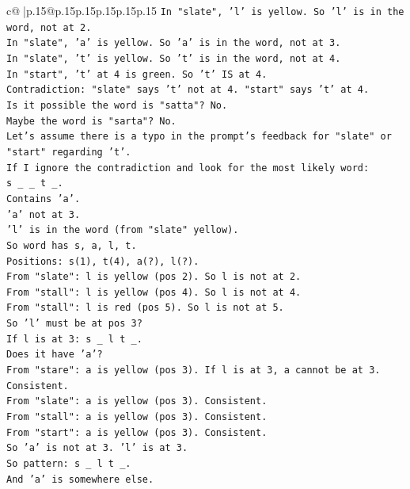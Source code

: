 \documentclass{article}
\begin{document}
{\begin{supertabular}{c@{$\;$}|p{.15\linewidth}@{}p{.15\linewidth}p{.15\linewidth}p{.15\linewidth}p{.15\linewidth}p{.15\linewidth}}
{{{\texttt{In "slate", 'l' is yellow. So 'l' is in the word, not at 2.} \\
\texttt{In "slate", 'a' is yellow. So 'a' is in the word, not at 3.} \\
\texttt{In "slate", 't' is yellow. So 't' is in the word, not at 4.} \\
\texttt{In "start", 't' at 4 is green. So 't' IS at 4.} \\
\texttt{Contradiction: "slate" says 't' not at 4. "start" says 't' at 4.} \\
\texttt{Is it possible the word is "satta"? No.} \\
\texttt{Maybe the word is "sarta"? No.} \\
\texttt{Let's assume there is a typo in the prompt's feedback for "slate" or "start" regarding 't'.} \\
\texttt{If I ignore the contradiction and look for the most likely word:} \\
\texttt{s \_ \_ t \_.} \\
\texttt{Contains 'a'.} \\
\texttt{'a' not at 3.} \\
\texttt{'l' is in the word (from "slate" yellow).} \\
\texttt{So word has s, a, l, t.} \\
\texttt{Positions: s(1), t(4), a(?), l(?).} \\
\texttt{From "slate": l is yellow (pos 2). So l is not at 2.} \\
\texttt{From "stall": l is yellow (pos 4). So l is not at 4.} \\
\texttt{From "stall": l is red (pos 5). So l is not at 5.} \\
\texttt{So 'l' must be at pos 3?} \\
\texttt{If l is at 3: s \_ l t \_.} \\
\texttt{Does it have 'a'?} \\
\texttt{From "stare": a is yellow (pos 3). If l is at 3, a cannot be at 3. Consistent.} \\
\texttt{From "slate": a is yellow (pos 3). Consistent.} \\
\texttt{From "stall": a is yellow (pos 3). Consistent.} \\
\texttt{From "start": a is yellow (pos 3). Consistent.} \\
\texttt{So 'a' is not at 3. 'l' is at 3.} \\
\texttt{So pattern: s \_ l t \_.} \\
\texttt{And 'a' is somewhere else.} \\
}}}
\end{supertabular}}
\end{document}
